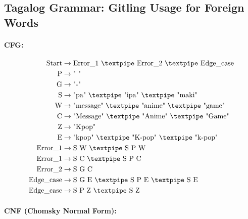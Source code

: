 \subsection{Tagalog Grammar: Gitling Usage for Foreign Words}

\paragraph{CFG:}

\begin{equation*}
    \begin{aligned}
        \text{Start}  & \rightarrow \text{Error\_1 {\textpipe} Error\_2 {\textpipe} Edge\_case}   \\
        \text{P}   & \rightarrow \text{" "}\\
        \text{G} & \rightarrow \text{"-"}\\        
        \text{S}    & \rightarrow \text{"pa" {\textpipe} "ipa" {\textpipe} "maki"}\\        
        \text{W} & \rightarrow \text{"message" {\textpipe} "anime" {\textpipe} "game"}\\
        \text{C} & \rightarrow \text{"Message" {\textpipe} "Anime" {\textpipe} "Game"}\\
        \text{Z} & \rightarrow \text{"Kpop"}\\        
        \text{E} & \rightarrow \text{"kpop" {\textpipe} "K-pop" {\textpipe} "k-pop"}\\        
        \text{Error\_1}  & \rightarrow \text{S W {\textpipe} S P W}   \\
        \text{Error\_1}  & \rightarrow \text{S C {\textpipe} S P C}   \\
        \text{Error\_2}  & \rightarrow \text{S G C}   \\
        \text{Edge\_case}  & \rightarrow \text{S G E {\textpipe} S P E {\textpipe} S E} \\   
        \text{Edge\_case}  & \rightarrow \text{S P Z {\textpipe} S Z}         
    \end{aligned}
\end{equation*}

\paragraph{CNF (Chomsky Normal Form):}

